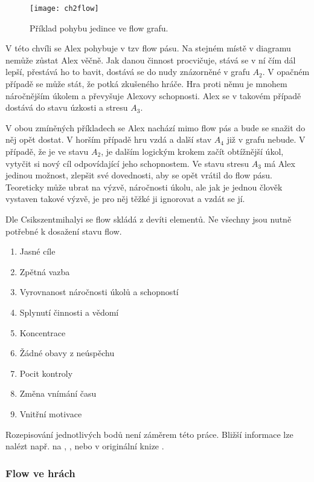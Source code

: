\begin{figure}
  \centering
  \texttt{[image: ch2flow]}
	\caption{Příklad pohybu jedince ve flow grafu. \cite{OptimalFun} }
	\label{fig:ch2flow}
\end{figure}

V této chvíli se Alex pohybuje v tzv flow pásu. Na stejném místě v diagramu nemůže zůstat Alex věčně. Jak danou činnost procvičuje, stává se v ní čím dál lepší, přestává ho to bavit, dostává se do nudy znázorněné v grafu $A_2$. V opačném případě se může stát, že potká zkušeného hráče. Hra proti němu je mnohem náročnějším úkolem a převyšuje Alexovy schopnosti. Alex se v takovém případě dostává do stavu úzkosti a stresu $A_3$.

V obou zmíněných příkladech se Alex nachází mimo flow pás a bude se snažit do něj opět dostat. V horším případě hru vzdá a další stav $A_4$ již v grafu nebude. V případě, že je ve stavu $A_2$, je dalším logickým krokem začít obtížnější úkol, vytyčit si nový cíl odpovídající jeho schopnostem. Ve stavu stresu $A_3$ má Alex jedinou možnost, zlepšit své dovednosti, aby se opět vrátil do flow pásu. Teoreticky může ubrat na výzvě, náročnosti úkolu, ale jak je jednou člověk vystaven takové výzvě, je pro něj těžké ji ignorovat a vzdát se jí. \cite{OptimalFun}

Dle Csikszentmihalyi se flow skládá z devíti elementů. \cite{FlowEng} Ne všechny jsou nutně potřebné k dosažení stavu flow.

\begin{enumerate}
	\item Jasné cíle
	\item Zpětná vazba
	\item Vyrovnanost náročnosti úkolů a schopností
	\item Splynutí činnosti a vědomí
	\item Koncentrace
	\item Žádné obavy z neúspěchu
	\item Pocit kontroly
	\item Změna vnímání času
	\item Vnitřní motivace
\end{enumerate}

Rozepisování jednotlivých bodů není záměrem této práce. Bližší informace lze nalézt např. na \cite{FlowEng}, \cite{FlowCZ}, nebo v originální knize \cite{OptimalFun}.

\subsubsection{Flow ve hrách}

